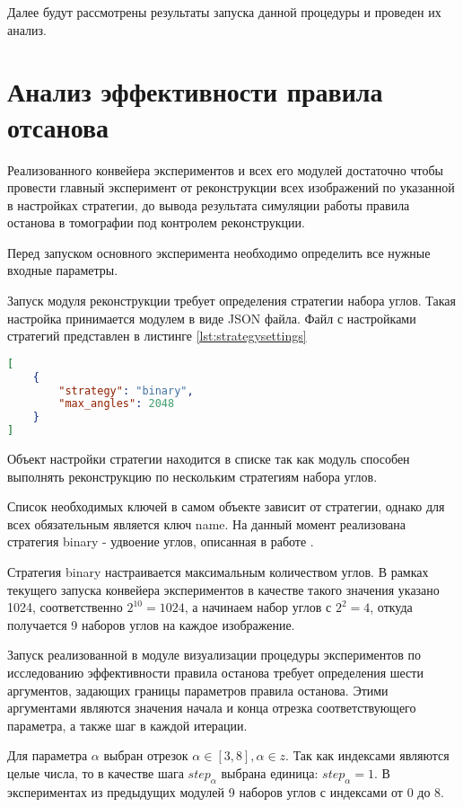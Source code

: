 Далее будут рассмотрены результаты запуска данной процедуры и проведен их анализ.

\section{Анализ эффективности правила отсанова}

Реализованного конвейера экспериментов и всех его модулей достаточно чтобы провести главный эксперимент от реконструкции всех изображений по указанной в настройках стратегии, до вывода результата симуляции работы правила останова в томографии под контролем реконструкции.

Перед запуском основного эксперимента необходимо определить все нужные входные параметры.

Запуск модуля реконструкции требует определения стратегии набора углов. Такая настройка принимается модулем в виде JSON файла. Файл с настройками стратегий представлен в листинге \ref*{lst:strategysettings}

\begin{lstlisting}[language=json, caption={Файл конфигурации стратегий набора углов для конвейера экспериментов}, label={lst:strategysettings}]
[
    {
        "strategy": "binary",
        "max_angles": 2048
    }
]
\end{lstlisting}

Объект настройки стратегии находится в списке так как модуль способен выполнять реконструкцию по нескольким стратегиям набора углов.

Список необходимых ключей в самом объекте зависит от стратегии, однако для всех обязательным является ключ name. На данный момент реализована стратегия binary - удвоение углов, описанная в работе \cite{gilmanov2024applicability}.

Стратегия binary настраивается максимальным количеством углов. В рамках текущего запуска конвейера экспериментов в качестве такого значения указано 1024, соответственно \(2^{10} = 1024\), а начинаем набор углов с \(2^2 = 4\), откуда получается 9 наборов углов на каждое изображение.

Запуск реализованной в модуле визуализации процедуры экспериментов по исследованию эффективности правила останова требует определения шести аргументов, задающих границы параметров правила останова. Этими аргументами являются значения начала и конца отрезка соответствующего параметра, а также шаг в каждой итерации.

Для параметра \(\alpha\) выбран отрезок \(\alpha \in [3, 8], \alpha \in z\). Так как индексами являются целые числа, то в качестве шага \(step_{\alpha}\) выбрана единица: \(step_{\alpha} = 1\). В экспериментах из предыдущих модулей 9 наборов углов с индексами от 0 до 8.

